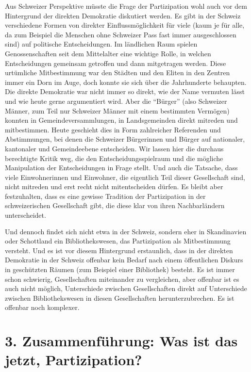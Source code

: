 \documentclass[a4paper,
fontsize=11pt,
oneside,
numbers=noperiodatend,
parskip=half-,
bibliography=totoc,
final
]{scrartcl}
\begin{document}
Aus Schweizer Perspektive müsste die Frage der Partizipation wohl auch
vor dem Hintergrund der direkten Demokratie diskutiert werden. Es gibt
in der Schweiz verschiedene Formen von direkter Einflussmöglichkeit für
viele (kaum je für alle, da zum Beispiel die Menschen ohne Schweizer
Pass fast immer ausgeschlossen sind) auf politische Entscheidungen. Im
ländlichen Raum spielen Genossenschaften seit dem Mittelalter eine
wichtige Rolle, in welchen Entscheidungen gemeinsam getroffen und dann
mitgetragen werden. Diese urtümliche Mitbestimmung war den Städten und
den Eliten in den Zentren immer ein Dorn im Auge, doch konnte sie sich
über die Jahrhunderte behaupten. Die direkte Demokratie war nicht immer
so direkt, wie der Name vermuten lässt und wie heute gerne argumentiert
wird. Aber die \enquote{Bürger} (also Schweizer Männer, zum Teil nur
Schweizer Männer mit einem bestimmten Vermögen) konnten in
Gemeindeversammlungen, in Landsgemeinden direkt mitreden und
mitbestimmen. Heute geschieht dies in Form zahlreicher Referenden und
Abstimmungen, bei denen die Schweizer Bürgerinnen und Bürger auf
nationaler, kantonaler und Gemeindeebene entscheiden. Wir lassen hier
die durchaus berechtigte Kritik weg, die den Entscheidungsspielraum und
die mögliche Manipulation der Entscheidungen in Frage stellt. Und auch
die Tatsache, dass viele Einwohnerinnen und Einwohner, die eigentlich
Teil dieser Gesellschaft sind, nicht mitreden und erst recht nicht
mitentscheiden dürfen. Es bleibt aber festzuhalten, dass es eine gewisse
Tradition der Partizipation in der schweizerischen Gesellschaft gibt,
die diese klar von ihren Nachbarländern unterscheidet.

Und dennoch findet sich nicht etwa in der Schweiz, sondern eher in
Skandinavien oder Schottland ein Bibliothekswesen, das Partizipation als
Mitbestimmung versteht. Und es ist vor diesem Hintergrund erstaunlich,
dass in der direkten Demokratie in der Schweiz offenbar kein Bedarf nach
einem öffentlichen Diskurs in geschützten Räumen (zum Beispiel einer
Bibliothek) besteht. Es ist immer schon schwierig, Gesellschaften
miteinander zu vergleichen, aber offenbar ist es auch nicht möglich,
Unterschiede zwischen Gesellschaften direkt auf Unterschiede zwischen
Bibliothekswesen in diesen Gesellschaften herunterzubrechen. Es ist
offenbar noch komplexer.

\hypertarget{zusammenfuxfchrung-was-ist-das-jetzt-partizipation}{%
\section{3. Zusammenführung: Was ist das jetzt,
Partizipation?}\label{zusammenfuxfchrung-was-ist-das-jetzt-partizipation}}
\end{document}
